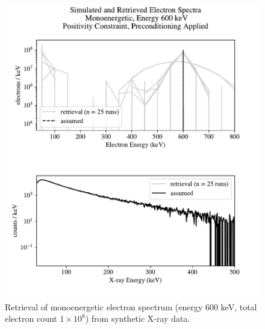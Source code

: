 \begin{figure}[p]
    \centering
    \includegraphics[width=\textwidth]{figures/chapter_4/synthetic_data_examples/mono_600keV_posonly_preconditioning_1e8_particles}
    \caption{Retrieval of monoenergetic electron spectrum (energy 600 keV, total electron count $1\times10^8$) from synthetic X-ray data.}
    \label{why_non_negative_is_good}
\end{figure}

